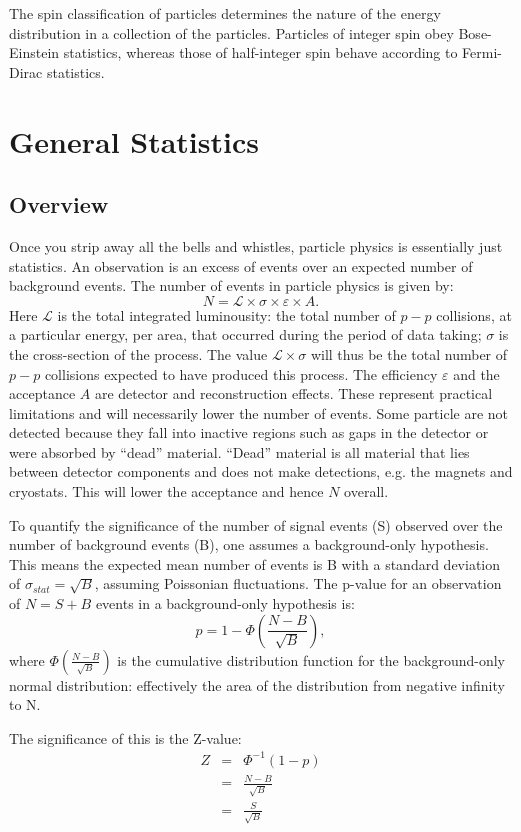 \documentclass{article}
\begin{document}
The spin classification of particles determines the nature of the energy distribution in a collection of the particles. Particles of integer spin obey Bose-Einstein statistics, whereas those of half-integer spin behave according to Fermi-Dirac statistics.

\section{General Statistics}

\subsection{Overview}
Once you strip away all the bells and whistles, particle physics is essentially just statistics. An observation is an excess of events over an expected number of background events. The number of events in particle physics is given by:
$$ N = \mathcal{L} \times \sigma \times \varepsilon \times A. $$
Here $\mathcal{L}$ is the total integrated luminousity: the total number of $p-p$ collisions, at a particular energy, per area, that occurred during the period of data taking; $\sigma$ is the cross-section of the process. The value $\mathcal{L} \times \sigma$ will thus be the total number of $p-p$ collisions expected to have produced this process. The efficiency $\varepsilon$ and the acceptance $A$ are detector and reconstruction effects. These represent practical limitations and will necessarily lower the number of events. Some particle are not detected because they fall into inactive regions such as gaps in the detector or were absorbed by ``dead'' material. ``Dead'' material is all material that lies between detector components and does not make detections, e.g. the magnets and cryostats. This will lower the acceptance and hence $N$ overall.

To quantify the significance of the number of signal events (S) observed over the number of background events (B), one assumes a background-only hypothesis. This means the expected mean number of events is B with a standard deviation of $\sigma_{stat} = \sqrt{B}$, assuming Poissonian fluctuations. The p-value for an observation of $N = S + B$ events in a background-only hypothesis is:
$$p = 1 - \Phi \left(\frac{N-B}{\sqrt{B}}\right),$$
where $\Phi \left(\frac{N-B}{\sqrt{B}}\right)$ is the cumulative distribution function for the background-only normal distribution: effectively the area of the distribution from negative infinity to N.

The significance of this is the Z-value:
\begin{eqnarray}
Z &=& \Phi ^{-1} (1-p) \nonumber \\
 &=& \frac{N-B}{\sqrt{B}} \nonumber \\
 &=& \frac{S}{\sqrt{B}} \nonumber
\end{eqnarray}
\end{document}
